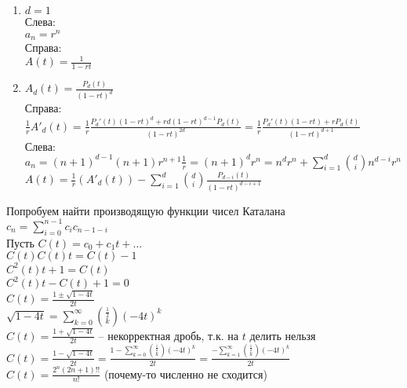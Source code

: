 \documentclass[12pt]{article}
\begin{document}
\begin{enumerate}
    \item $d=1$\\
    Слева:\\
    $a_n = r^n$\\
    Справа:\\
    $A(t) = \frac{1}{1-rt}$
    \item $A_d(t) = \frac{P_d(t)}{(1-rt)^d}$\\
    Справа:\\
    $\frac1rA'_d(t) = \frac1r\frac{P_d'(t)(1-rt)^d+rd(1-rt)^{d-1}P_d(t)}{(1-rt)^{2d}} = \frac1r\frac{P_d'(t)(1-rt)+rP_d(t)}{(1-rt)^{d+1}}$\\
    Слева:\\
    $a_n = (n+1)^{d-1}(n+1)r^{n+1}\frac1r=(n+1)^dr^{n}=n^dr^n + \sum_{i=1}^d \binom{d}{i}n^{d-i}r^n$\\
    $A(t) = \frac{1}{r}(A'_d(t)) - \sum_{i=1}^d\binom{d}{i}\frac{P_{d-i}(t)}{(1-rt)^{d-i+1}}$
\end{enumerate}
Попробуем найти производящую функции чисел Каталана\\
$c_n = \sum_{i=0}^{n-1} c_ic_{n-1-i}$\\
Пусть $C(t) = c_0 + c_1t + \ldots$\\
$C(t)C(t)t = C(t)-1$\\
$C^2(t)t + 1 = C(t)$\\
$C^2(t)t - C(t) + 1 = 0$\\
$C(t) = \frac{1\pm\sqrt{1-4t}}{2t}$\\
$\sqrt{1-4t} = \sum_{k=0}^\infty \binom{\frac12}{k}(-4t)^k$\\
$C(t) = \frac{1+\sqrt{1-4t}}{2t}$ -- некорректная дробь, т.к. на $t$ делить нельзя\\
$C(t) = \frac{1-\sqrt{1-4t}}{2t} = \frac{1-\sum_{k=0}^\infty \binom{\frac12}{k}(-4t)^k}{2t} = \frac{-\sum_{k=1}^\infty \binom{\frac12}{k}(-4t)^k}{2t}$\\
$C(t) = \frac{2^n(2n+1)!!}{n!}$ (почему-то численно не сходится)
\end{document}
